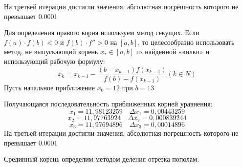 \documentclass[14pt,a4paper]{scrartcl}
\begin{document}
На третьей итерации достигли значения, абсолютная погрешность которого не превышает 0.0001

Для определения правого корня используем метод секущих.
Если $ f(a)\cdot f(b) < 0$ и $f(b) \cdot f'' > 0$ на $[a,b]$, то целесообразно использовать метод, не выпускающий корень $x_* \in [a,b]$ из найденной «вилки» и использующий рабочую формулу:
\begin{equation*}
	x_{k}=x_{k-1}-\frac{\left(b-x_{k-1}\right) f\left(x_{k-1}\right)}{f(b)-f\left(x_{k-1}\right)}(k \in N)
\end{equation*}
Пусть начальное приближение $x_0 = 12$ при $b = 13$

Получающаяся последовательность приближенных корней уравнения:
\begin{equation*}
	x_1 = 11,98123259 \quad \Delta x_1 = 0,00443259
\end{equation*}
\begin{equation*}
	x_2 = 11,97763924 \quad \Delta x_2 = 0,000839244
\end{equation*}
\begin{equation*}
	x_3 = 11,97694896 \quad \Delta x_3 = 0,00014896
\end{equation*}
На третьей итерации достигли значения, абсолютная погрешность которого не превышает 0.0001

Срединный корень определим методом деления отрезка пополам.
\end{document}
